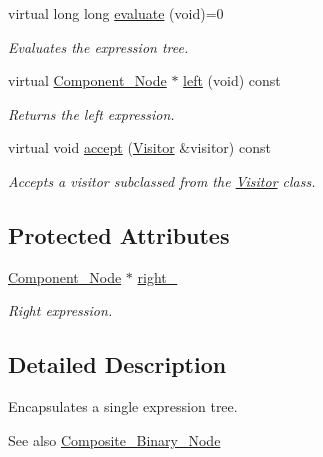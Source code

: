 \begin{DoxyCompactItemize}
virtual long long \hyperlink{classMadara_1_1Expression__Tree_1_1Component__Node_a16c08750339b84c363e9fd0ea9858969}{evaluate} (void)=0
\begin{DoxyCompactList}\small\item\em Evaluates the expression tree. \item\end{DoxyCompactList}\item 
virtual \hyperlink{classMadara_1_1Expression__Tree_1_1Component__Node}{Component\_\-Node} $\ast$ \hyperlink{classMadara_1_1Expression__Tree_1_1Component__Node_abe0c7474f1af4cb06d06ab13479a89db}{left} (void) const 
\begin{DoxyCompactList}\small\item\em Returns the left expression. \item\end{DoxyCompactList}\item 
virtual void \hyperlink{classMadara_1_1Expression__Tree_1_1Component__Node_ac3bb92d96b29f14ee23289c73a2307d1}{accept} (\hyperlink{classMadara_1_1Expression__Tree_1_1Visitor}{Visitor} \&visitor) const 
\begin{DoxyCompactList}\small\item\em Accepts a visitor subclassed from the \hyperlink{classMadara_1_1Expression__Tree_1_1Visitor}{Visitor} class. \item\end{DoxyCompactList}\end{DoxyCompactItemize}
\subsection*{Protected Attributes}
\begin{DoxyCompactItemize}
\item 
\hyperlink{classMadara_1_1Expression__Tree_1_1Component__Node}{Component\_\-Node} $\ast$ \hyperlink{classMadara_1_1Expression__Tree_1_1Composite__Unary__Node_a077b7bd1b52df6f5c6adfde735556a68}{right\_\-}
\begin{DoxyCompactList}\small\item\em Right expression. \item\end{DoxyCompactList}\end{DoxyCompactItemize}


\subsection{Detailed Description}
Encapsulates a single expression tree. \begin{DoxySeeAlso}{See also}
\hyperlink{classMadara_1_1Expression__Tree_1_1Composite__Binary__Node}{Composite\_\-Binary\_\-Node} 
\end{DoxySeeAlso}


